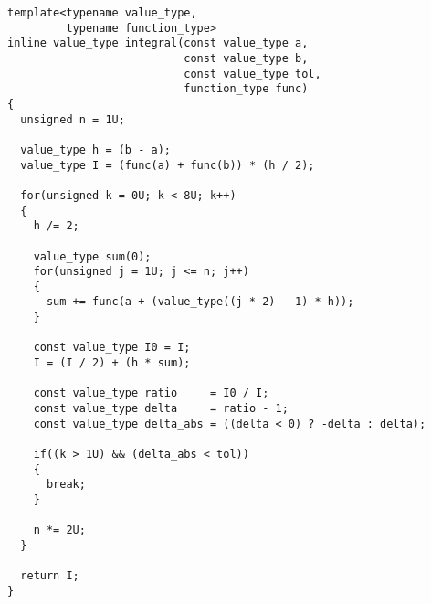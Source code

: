 \documentclass{article}[11pt,draft]
\begin{document}
\begin{lstlisting}
template<typename value_type,
         typename function_type>
inline value_type integral(const value_type a,
                           const value_type b,
                           const value_type tol,
                           function_type func)
{
  unsigned n = 1U;

  value_type h = (b - a);
  value_type I = (func(a) + func(b)) * (h / 2);

  for(unsigned k = 0U; k < 8U; k++)
  {
    h /= 2;

    value_type sum(0);
    for(unsigned j = 1U; j <= n; j++)
    {
      sum += func(a + (value_type((j * 2) - 1) * h));
    }

    const value_type I0 = I;
    I = (I / 2) + (h * sum);

    const value_type ratio     = I0 / I;
    const value_type delta     = ratio - 1;
    const value_type delta_abs = ((delta < 0) ? -delta : delta);

    if((k > 1U) && (delta_abs < tol))
    {
      break;
    }

    n *= 2U;
  }

  return I;
}
\end{lstlisting}
\end{document}
